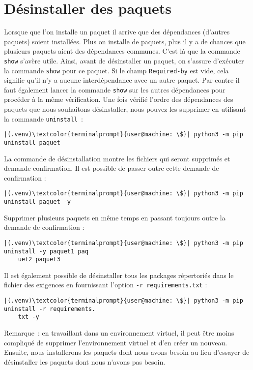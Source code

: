 \section{Désinstaller des paquets}
Lorsque que l'on installe un paquet il arrive que des dépendances (d'autres paquets) soient installées. Plus on installe de paquets, plus il y a de chances que plusieurs paquets aient des dépendances communes. C’est là que la commande \texttt{show} s’avère utile. Ainsi, avant de désinstaller un paquet, on s'assure d’exécuter la commande \texttt{show} pour ce paquet. Si le champ \texttt{Required-by} est vide, cela signifie qu'il n'y a aucune interdépendance avec un autre paquet. Par contre il faut également lancer la commande \texttt{show} sur les autres dépendances pour procéder à la même vérification. Une fois vérifié l’ordre des dépendances des paquets que nous souhaitons désinstaller, nous pouvez les supprimer en utilisant la commande \texttt{uninstall} :
\begin{lstlisting}[style=terminal]
|(.venv)\textcolor{terminalprompt}{user@machine: \$}| python3 -m pip uninstall paquet
\end{lstlisting}

La commande de désinstallation montre les fichiers qui seront supprimés et demande confirmation. Il est possible de passer outre cette demande de confirmation :
\begin{lstlisting}[style=terminal]
|(.venv)\textcolor{terminalprompt}{user@machine: \$}| python3 -m pip uninstall paquet -y
\end{lstlisting}

Supprimer plusieurs paquets en même temps en passant toujours outre la demande de confirmation :
\begin{lstlisting}[style=terminal]
|(.venv)\textcolor{terminalprompt}{user@machine: \$}| python3 -m pip uninstall -y paquet1 paq
    uet2 paquet3
\end{lstlisting}

Il est également possible de désinstaller tous les packages répertoriés dans le fichier des exigences en fournissant l’option \texttt{-r requirements.txt} :
\begin{lstlisting}[style=terminal]
|(.venv)\textcolor{terminalprompt}{user@machine: \$}| python3 -m pip uninstall -r requirements.
    txt -y 
\end{lstlisting}

Remarque : en travaillant dans un environnement virtuel, il peut être moins compliqué de supprimer l'environnement virtuel et d’en créer un nouveau. Ensuite, nous installerons les paquets dont nous avons besoin au lieu d’essayer de désinstaller les paquets dont nous n’avons pas besoin.

